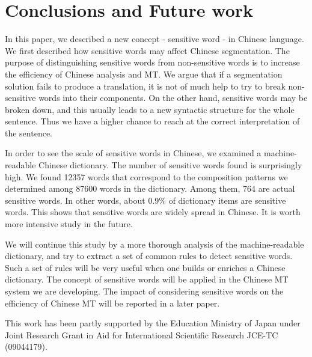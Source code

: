 \section{ Conclusions and Future work}

In this paper, we described a new concept - sensitive word - in Chinese language. We first described how sensitive 
words may affect Chinese segmentation. The purpose of distinguishing sensitive words from non-sensitive words is to 
increase the efficiency of Chinese analysis and MT. We argue that if a segmentation solution fails to produce a 
translation, it is not of much help to try to break non-sensitive words into their components. On the other hand, sensitive words 
may be broken down, and this usually leads to a new syntactic structure for the whole sentence. Thus we have a higher 
chance to reach at the correct interpretation of the sentence.

In order to see the scale of sensitive words in Chinese, we examined a machine-readable Chinese dictionary. The 
number of sensitive words found is surprisingly high. We found 12357 words that correspond to the composition 
patterns we determined among 87600 words in the dictionary. Among them, 764 are actual sensitive words. In other 
words, about 0.9\% of dictionary items are sensitive words. This shows that sensitive words are widely spread in 
Chinese. It is worth more intensive study in the future.

We will continue this study by a more thorough analysis of the machine-readable dictionary, and try to extract a set of 
common rules to detect sensitive words. Such a set of rules will be very useful when one builds or enriches a 
Chinese dictionary. The concept of sensitive words will be applied in the Chinese MT system we are developing. The 
impact of considering sensitive words on the efficiency of Chinese MT will be reported in a later paper.


\acknowledgment

This work has been partly supported by the Education Ministry of Japan under Joint Research Grant in Aid for 
International Scientific Research JCE-TC (09044179).




